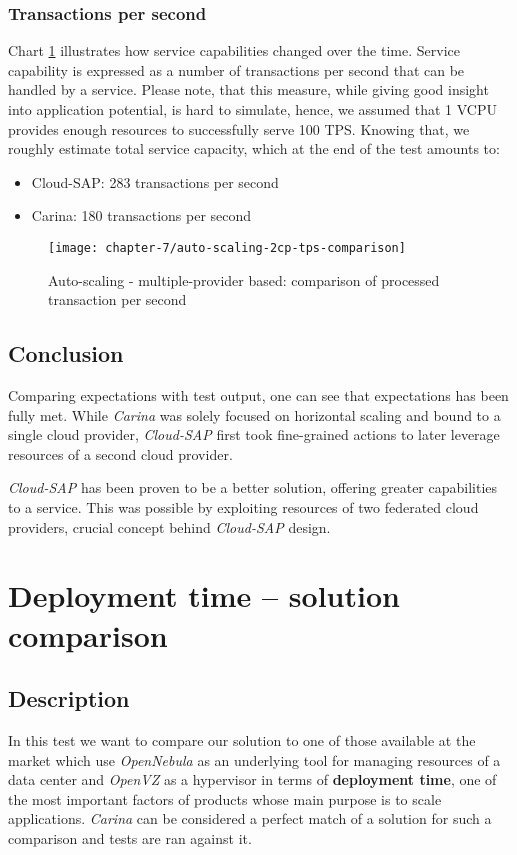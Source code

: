 \subsubsection*{Transactions per second}
Chart \ref{eval:auto-scaling-2cp-tps-comparison} illustrates how service capabilities changed over the time. Service capability is expressed as a number of transactions per second that can be handled by a service. Please note, that this measure, while giving good insight into application potential, is hard to simulate, hence, we assumed that 1 VCPU provides enough resources to successfully serve 100 TPS. Knowing that, we roughly estimate total service capacity, which at the end of the test amounts to:
\begin{itemize}
 \item Cloud-SAP: 283 transactions per second
 \item Carina: 180 transactions per second
\end{itemize}

\begin{figure}[!ht]
  \begin{center}
    \texttt{[image: chapter-7/auto-scaling-2cp-tps-comparison]}
  \end{center}
  \caption{Auto-scaling - multiple-provider based: comparison of processed transaction per second}
  \label{eval:auto-scaling-2cp-tps-comparison}
\end{figure}

\subsection*{Conclusion}
Comparing expectations with test output, one can see that expectations has been fully met. While \emph{Carina} was solely focused on horizontal scaling and bound to a single cloud provider, \emph{Cloud-SAP} first took fine-grained actions to later leverage resources of a second cloud provider.

\emph{Cloud-SAP} has been proven to be a better solution, offering greater capabilities to a service. This was possible by exploiting resources of two federated cloud providers, crucial concept behind \emph{Cloud-SAP} design.


\section{Deployment time -- solution comparison}
\subsection*{Description}
In this test we want to compare our solution to one of those available at the market which use \emph{OpenNebula} as an underlying tool for managing resources of a data center and \emph{OpenVZ} as a hypervisor in terms of \textbf{deployment time}, one of the most important factors of products whose main purpose is to scale applications.
\emph{Carina} \cite{Carina} can be considered a perfect match of a solution for such a comparison and tests are ran against it.

